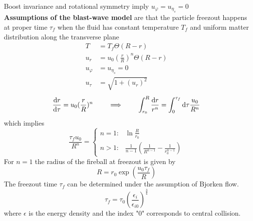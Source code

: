 Boost invariance and rotational symmetry imply $u_\varphi=u_{\eta_s}=0$ \\
\textbf{Assumptions of the blast-wave model} are that the particle freezout happens at proper time $\tau_f$ when the fluid has constant temperature $T_f$ and uniform matter distribution along the transverse plane
\begin{subequations}
    \begin{align}
        T         & =T_f\Theta(R-r)                \\
        u_r       & =u_0(\frac{r}{R})^n\Theta(R-r) \\
        u_\varphi & =u_{\eta_s}=0                  \\
        u_\tau    & =\sqrt{1+(u_r)^2}
    \end{align}
\end{subequations}
\begin{equation}
    \frac{\text{d} r}{\text{d}\tau}=u_0(\frac{r}{R})^n\qquad\implies\qquad\int_{r_0}^R\frac{\text{d} r}{r^n}=\int_0^{\tau_f}\text{d}\tau\frac{u_0}{R^n}
\end{equation}
which implies
\begin{equation}
    \frac{\tau_fu_0}{R^n}=
    \begin{cases}
        n=1: & \ln\frac{R}{r_0}                                     \\
        n>1: & \frac{1}{n-1}(\frac{1}{R^{n-1}}-\frac{1}{r_0^{n-1}})
    \end{cases}
\end{equation}
For $n=1$ the radius of the fireball at freezout is given by
\begin{equation}
    R=r_0\exp\left(\frac{u_0\tau_f}{R}\right)
\end{equation}
The freezout time $\tau_f$ can be determined under the assumption of Bjorken flow.
\begin{equation}
    \tau_f=\tau_0\left(\frac{\epsilon_i}{\epsilon_{i0}}\right)^\frac{3}{4}
\end{equation}
where $\epsilon$ is the energy density and the index "$0$" corresponds to central collision.

